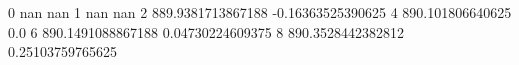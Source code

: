0 nan nan
1 nan nan
2 889.9381713867188 -0.16363525390625
4 890.101806640625 0.0
6 890.1491088867188 0.04730224609375
8 890.3528442382812 0.25103759765625
